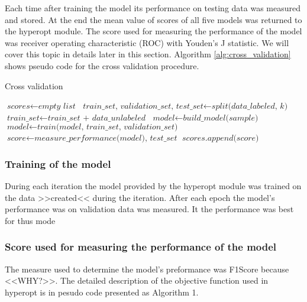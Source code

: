 \documentclass[a4paper,10pt]{report}
\begin{document}
	Each time after training the model its performance on testing data was measured and stored. At the end the mean value of scores of all five models was returned to the hyperopt module. The score used for measuring the performance of the model was receiver operating characteristic (ROC) with Youden's J statistic. We will cover this topic in details later in this section. Algorithm \ref{alg:cross_validation} shows pseudo code for the cross validation procedure.\\
	
	\begin{algorithm}
	\caption{Cross validation}\label{alg:cross_validation}
	\begin{algorithmic}[1]
	\State
	\State $\textit{scores} \gets \textit{empty list}$
	\State
	  \State $\textit{train\_set, validation\_set, test\_set} \gets \textit{split(data\_labeled, k)} $
	  \State $\textit{train\_set} \gets \textit{train\_set + data\_unlabeled}$
	  \State $\textit{model} \gets \textit{build\_model(sample)}$
	  \State $\textit{model} \gets \textit{train(model, train\_set, validation\_set)}$
	  \State $\textit{score} \gets \textit{measure\_performance(model), test\_set}$
	  \State $\textit{scores.append(score)}$
	\EndFor
	\State       
	\State
	\EndProcedure
	\end{algorithmic}
	\end{algorithm}
	
	\subsubsection{Training of the model}
	During each iteration the model provided by the hyperopt module was trained on the data >>created<< during the iteration. After each epoch the model's performance was on validation data was measured. It the performance was best for thus mode
	
	
	\subsubsection{Score used for measuring the performance of the model}
	The measure used to determine the model's preformance was F1Score because <<WHY?>>. The detailed description of the objective function used in hyperopt is in pesudo code presented as Algorithm 1.\\
	
	
	
\end{document}
